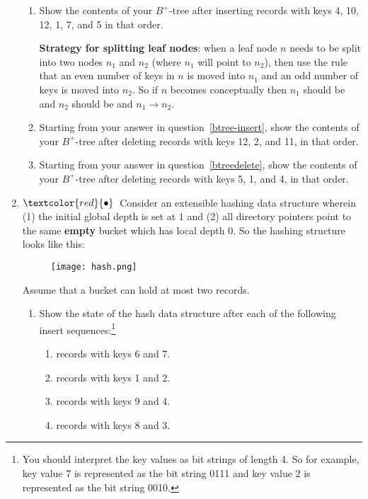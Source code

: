 \documentclass{article}
\newcommand{\redbullet}{$\textcolor{red}{\bullet}$}
\begin{document}
\begin{enumerate}[resume]
\begin{enumerate}
\item \label{btree-insert} Show the contents of your $B^+$-tree after
inserting records with keys 4, 10, 12, 1, 7, and 5 in that order.

{\bf Strategy for splitting leaf nodes}: when a leaf node $n$ needs to be split into two nodes $n_1$ and $n_2$ (where $n_1$ will point to $n_2$), then use the
rule that an even number of keys in $n$ is moved into $n_1$ and an odd number of keys is moved into $n_2$.   So if $n$ becomes conceptually  then $n_1$ should be  and $n_2$ should be  and $n_1 \rightarrow n_2$.

\item\label{btreedelete} Starting from your answer in question~\ref{btree-insert}, show
  the contents of your $B^+$-tree after deleting records with keys 12, 2, and 11, in that order.
\item Starting from your answer in question~\ref{btreedelete}, show
  the contents of your $B^+$-tree after deleting records with keys 5, 1, and 4, in that order.
\end{enumerate}

\newpage
\item \redbullet\ 
Consider an extensible hashing data structure wherein (1) the
initial global depth is set at $1$ and (2) all directory pointers point
to the same {\bf empty} bucket which has local depth $0$. So the hashing
structure looks like this:
\begin{figure}[h]
        \centering
        \texttt{[image: hash.png]}
    \end{figure}
\bigskip
Assume that a bucket can hold at most two records.

\begin{enumerate}
\item\label{ext-insert} Show the state of the hash data structure after each of the
  following insert sequences:\footnote{You should interpret the key values as bit strings of length 4.   So for example,  key value 7 is represented as the bit string 0111 
and key value 2 is represented as the bit string 0010.}

\begin{enumerate}
\item records with keys 6 and 7.
\item records with keys 1 and 2.
\item records with keys 9 and 4.
\item records with keys 8 and 3.
\end{enumerate}



\end{enumerate}
\end{enumerate}
\end{document}
